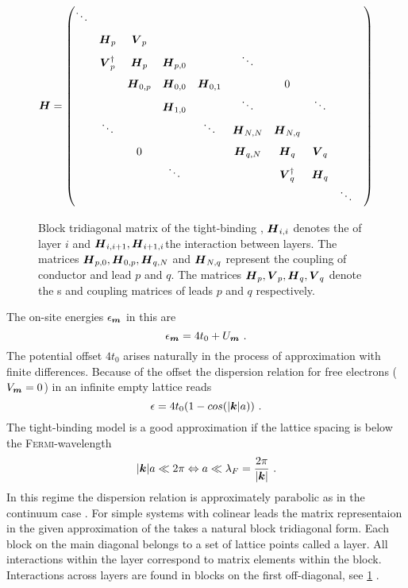 \begin{figure}[h!]
\centering
\begin{align*}
\mat{H}=
\renewcommand*{\arraystretch}{1.6}
\begin{pmatrix} 
\ddots& & & & & & & & & \\
& \mat{H}_p& \mat{V}_p& & & && &&\\
& \mat{V}^{\dagger}_p& \mat{H}_p& \mat{H}_{p,0}& &\ddots& & &\\
& &\mat{H}_{0,p}&\mat{H}_{0,0} &\mat{H}_{0,1} & &0 & &\\
& & &\mat{H}_{1,0}& &\ddots & &\ddots &\\
& \ddots& & &\ddots &\mat{H}_{N,N} &\mat{H}_{N,q}& & \\
& &0 & & &\mat{H}_{q,N} &\mat{H}_q &\mat{V}_q&\\
& & &\ddots & & &\mat{V}^{\dagger}_q &\mat{H}_q&\\
& & & & & & & &\ddots
\end{pmatrix}
\end{align*}
\caption{Block tridiagonal matrix of the tight-binding \hamil{}, $\boldsymbol{H}_{i,i}$ denotes the \hamil{} of layer $i$ and $\boldsymbol{H}_{i,i+1},\boldsymbol{H}_{i+1,i}$the interaction between layers. The matrices $\boldsymbol{H}_{p,0},\boldsymbol{H}_{0,p},\boldsymbol{H}_{q,N}$ and $\boldsymbol{H}_{N,q}$ represent the coupling of conductor and lead $p$ and $q$. The matrices $\boldsymbol{H}_p,\boldsymbol{V}_p,\boldsymbol{H}_q,\boldsymbol{V}_q$ denote the \hamil s and coupling matrices of leads $p$ and $q$ respectively.}
\label{fig:blocktridiagonal}
\end{figure}
The on-site energies $\epsilon_{\boldsymbol{m}}$ in this \hamil{} are
\begin{equation}
\epsilon_{\boldsymbol{m}} = 4t_0 + U_{\boldsymbol{m}}\ .
\end{equation}
The potential offset $4t_0$ arises naturally in the process of approximation with finite differences. Because of the offset the dispersion relation for free electrons ($V_{\boldsymbol{m}}=0$) in an infinite empty lattice reads
\begin{equation}
\epsilon = 4t_0(1-cos(\lvert\boldsymbol{k}\rvert a))\ .
\end{equation}
The tight-binding model is a good approximation if the lattice spacing is below the \textsc{Fermi}-wavelength
\begin{equation}
\lvert\boldsymbol{k}\rvert a \ll  2\pi \Leftrightarrow a \ll \lambda_F = \frac{2\pi}{\lvert\boldsymbol{k}\rvert} \ .
\end{equation}
In this regime the dispersion relation is approximately parabolic as in the continuum case \cite{Metalidis2007Thesis}.
For simple systems with colinear leads the matrix representaion in the given approximation of the \hamil{} takes a natural block tridiagonal form. Each block on the main diagonal belongs to a set of lattice points called a layer. All interactions within the layer correspond to matrix elements within the block. Interactions across layers are found in blocks on the first off-diagonal, see \cref{fig:blocktridiagonal} \cite{AnLunNik2008}.
